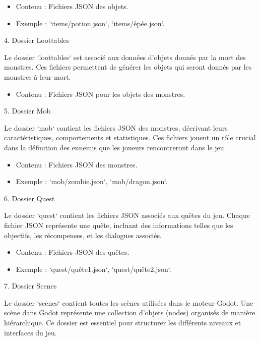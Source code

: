 \begin{itemize}
      \item Contenu : Fichiers JSON des objets.
      \item Exemple : `items/potion.json`, `items/épée.json`.
            \\
\end{itemize}

4. Dossier Loottables

Le dossier `loottables` est associé aux données d'objets donnés par la mort des monstres.
Ces fichiers permettent de générer les objets qui seront donnés par les monstres à leur mort.

\begin{itemize}
      \item Contenu : Fichiers JSON pour les objets des monstres.
            \\
\end{itemize}

5. Dossier Mob

Le dossier `mob` contient les fichiers JSON des monstres, décrivant leurs caractéristiques, comportements et statistiques.
Ces fichiers jouent un rôle crucial dans la définition des ennemis que les joueurs rencontreront dans le jeu.

\begin{itemize}
      \item Contenu : Fichiers JSON des monstres.
      \item Exemple : `mob/zombie.json`, `mob/dragon.json`.
            \\
\end{itemize}

6. Dossier Quest

Le dossier `quest` contient les fichiers JSON associés aux quêtes du jeu. Chaque fichier JSON représente une quête, incluant des informations telles que les objectifs, les récompenses, et les dialogues associés.

\begin{itemize}
      \item Contenu : Fichiers JSON des quêtes.
      \item Exemple : `quest/quête1.json`, `quest/quête2.json`.
            \\
\end{itemize}

7. Dossier Scenes

Le dossier `scenes` contient toutes les scènes utilisées dans le moteur Godot. Une scène dans Godot représente une collection d'objets (nodes) organisés de manière hiérarchique. Ce dossier est essentiel pour structurer les différents niveaux et interfaces du jeu.

